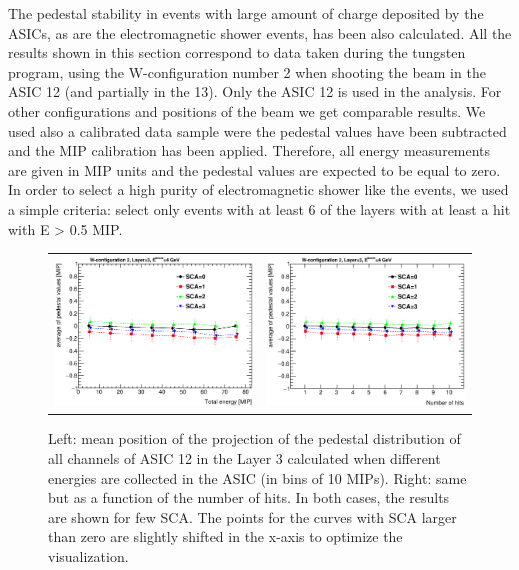 \documentclass[a4paper,11pt]{article}
\begin{document}
The pedestal stability in events with large amount of charge deposited by the ASICs, as are the 
electromagnetic shower events, has been also calculated. All the results shown in this section correspond to data taken during the tungsten program, 
using the W-configuration number 2 when shooting the beam in the ASIC 12 (and partially in the 13). Only the ASIC 12 is used in the analysis. For other configurations and 
positions of the beam we get comparable results. We used also a calibrated data sample were the pedestal values have been 
subtracted and the MIP calibration has been applied. 
Therefore, all energy measurements are given in MIP units and the pedestal
values are expected to be equal to zero.
In order to select a high purity of
electromagnetic shower like the events, 
we used a simple criteria: select only events with at least 6 of the layers with at least a hit with E > 0.5 MIP.

\begin{figure}[!t]
  \centering 
    \begin{tabular}{ll}
      \includegraphics[width=2.8in]{figs/pedestal/pedestal_vs_energy_shower.eps} & \includegraphics[width=2.8in]{figs/pedestal/pedestal_vs_nhits_shower.eps} \\
    \end{tabular}
    \caption{Left: mean position of the projection of the pedestal distribution of all channels of ASIC 12 in the Layer 3 calculated when different energies are collected in the ASIC (in bins of 10 MIPs). Right: same but as a function of the number of hits. In both cases, the results are shown for few SCA. The points for the curves with SCA larger than zero are slightly shifted in the x-axis to optimize the visualization.}
\label{pedestal_shower_1}
\end{figure}
\end{document}
